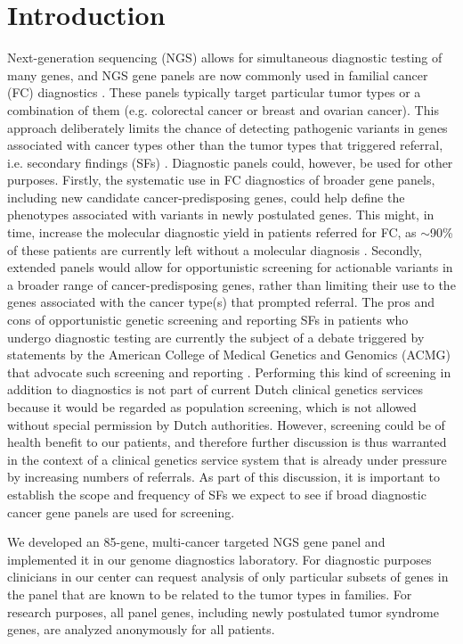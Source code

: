 \section{Introduction}\label{introduction}
Next-generation sequencing (NGS) allows for simultaneous diagnostic testing of many genes, and NGS gene panels are now commonly used in familial cancer (FC) diagnostics \cite{Okur_2017}. 
These panels typically target particular tumor types or a combination of them (e.g. colorectal cancer or breast and ovarian cancer). 
This approach deliberately limits the chance of detecting pathogenic variants in genes associated with cancer types other than the tumor types that triggered referral, i.e. secondary findings (SFs) \cite{DeRycke_2017,Concolino_2018}. 
Diagnostic panels could, however, be used for other purposes. 
Firstly, the systematic use in FC diagnostics of broader gene panels, including new candidate cancer-predisposing genes, could help define the phenotypes associated with variants in newly postulated genes. 
This might, in time, increase the molecular diagnostic yield in patients referred for FC, as $\sim$90\% of these patients are currently left without a molecular diagnosis \cite{Tung_2016,Thompson_2016,Minion_2015,LaDuca_2014}. 
Secondly, extended panels would allow for opportunistic screening for actionable variants in a broader range of cancer-predisposing genes, rather than limiting their use to the genes associated with the cancer type(s) that prompted referral. The pros and cons of opportunistic genetic screening and reporting SFs in patients who undergo diagnostic testing are currently the subject of a debate triggered by statements by the American College of Medical Genetics and Genomics (ACMG) that advocate such screening and reporting \cite{Green_2013,Burke_2013,Yu_2014,Kalia_2016,Haer_Wigman_2018,Wouters_2018,Brothers_2019,Esplin_2018}. 
Performing this kind of screening in addition to diagnostics is not part of current Dutch clinical genetics services because it would be regarded as population screening, which is not allowed without special permission by Dutch authorities. However, screening could be of health benefit to our patients, and therefore further discussion is thus warranted in the context of a clinical genetics service system that is already under pressure by increasing numbers of referrals. 
As part of this discussion, it is important to establish the scope and frequency of SFs we expect to see if broad diagnostic cancer gene panels are used for screening. 

We developed an 85-gene, multi-cancer targeted NGS gene panel and implemented it in our genome diagnostics laboratory. 
For diagnostic purposes clinicians in our center can request analysis of only particular subsets of genes in the panel that are known to be related to the tumor types in families. 
For research purposes, all panel genes, including newly postulated tumor syndrome genes, are analyzed anonymously for all patients.

